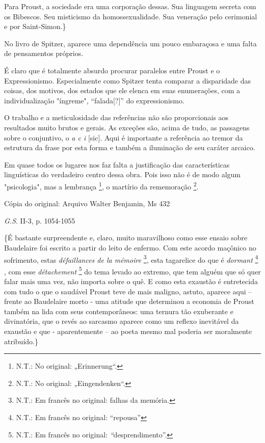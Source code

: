 Para Proust, a sociedade era uma corporação dessas. Sua linguagem
secreta com os Bibescos. Seu misticismo da homossexualidade. Sua
veneração pelo cerimonial e por Saint-Simon.\}

No livro de Spitzer, aparece uma dependência um pouco embaraçosa e uma
falta de pensamentos próprios.

É claro que é totalmente absurdo procurar paralelos entre Proust e o
Expressionismo. Especialmente como Spitzer tenta comparar a disparidade
das coisas, dos motivos, dos estados que ele elenca em suas enumerações,
com a individualização "íngreme", ``falada{[}?{]}'' do expressionismo.

O trabalho e a meticulosidade das referências não são proporcionais aos
resultados muito brutos e gerais. As exceções são, acima de tudo, as
passagens sobre o conjuntivo, o \emph{a c i} {[}sic{]}. Aqui é
importante a referência ao tremor da estrutura da frase por esta forma e
também a iluminação de seu caráter arcaico.

Em quase todos os lugares nos faz falta a justificação das
características linguísticas do verdadeiro centro dessa obra. Pois isso
não é de modo algum "psicologia", mas a lembrança \footnote{N.T.: No
  original: „Erinnerung``.}, o martírio da rememoração \footnote{N.T.:
  No original: „Eingendenken``.}.

Cópia do original: Arquivo Walter Benjamin, Ms 432

\emph{G.S}. II-3, p. 1054-1055

\{É bastante surpreendente e, claro, muito maravilhoso como esse ensaio
sobre Baudelaire foi escrito a partir do leito de enfermo. Com este
acordo maçônico no sofrimento, estas \emph{défaillances de la mémoire}
\footnote{N.T.: Em francês no original: falhas da memória.}, esta
tagarelice do que é \emph{dormant} \footnote{N.T.: Em francês no
  original: ``repousa''} , com esse \emph{détachement} \footnote{N.T.:
  Em francês no original: \emph{``}desprendimento''.} do tema levado ao
extremo, que tem alguém que só quer falar mais uma vez, não importa
sobre o quê. E como esta exaustão é entretecida com tudo o que o
saudável Proust teve de mais maligno, astuto, aparece aqui -- frente ao
Baudelaire morto - uma atitude que determinou a economia de Proust
também na lida com seus contemporâneos: uma ternura tão exuberante e
divinatória, que o revés ao sarcasmo aparece como um reflexo inevitável
da exaustão e que - aparentemente -- ao poeta mesmo mal poderia ser
moralmente atribuído.\}

